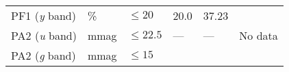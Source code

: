 \documentclass[DM,toc]{lsstdoc}
\begin{document}
\begin{longtable}[]{@{}llllll@{}}
\begin{minipage}[t]{0.14\columnwidth}\raggedright\strut
PF1 (\emph{y} band)\strut
\end{minipage} & \begin{minipage}[t]{0.06\columnwidth}\raggedright\strut
\%\strut
\end{minipage} & \begin{minipage}[t]{0.17\columnwidth}\raggedright\strut
\(\leq 20\)\strut
\end{minipage} & \begin{minipage}[t]{0.17\columnwidth}\raggedright\strut
20.0\strut
\end{minipage} & \begin{minipage}[t]{0.12\columnwidth}\raggedright\strut
37.23\strut
\end{minipage} & \begin{minipage}[t]{0.17\columnwidth}\raggedright\strut
\strut
\end{minipage}\tabularnewline
\begin{minipage}[t]{0.14\columnwidth}\raggedright\strut
PA2 (\emph{u} band)\strut
\end{minipage} & \begin{minipage}[t]{0.06\columnwidth}\raggedright\strut
mmag\strut
\end{minipage} & \begin{minipage}[t]{0.17\columnwidth}\raggedright\strut
\(\leq 22.5\)\strut
\end{minipage} & \begin{minipage}[t]{0.17\columnwidth}\raggedright\strut
---\strut
\end{minipage} & \begin{minipage}[t]{0.12\columnwidth}\raggedright\strut
---\strut
\end{minipage} & \begin{minipage}[t]{0.17\columnwidth}\raggedright\strut
No data\strut
\end{minipage}\tabularnewline
\begin{minipage}[t]{0.14\columnwidth}\raggedright\strut
PA2 (\emph{g} band)\strut
\end{minipage} & \begin{minipage}[t]{0.06\columnwidth}\raggedright\strut
mmag\strut
\end{minipage} & \begin{minipage}[t]{0.17\columnwidth}\raggedright\strut
\(\leq 15\)\strut
\end{minipage} & \begin{minipage}[t]{0.17\columnwidth}\raggedright\strut

\end{minipage}
\end{longtable}
\end{document}
